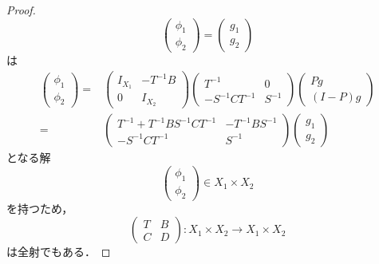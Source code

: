 \documentclass[11pt,a4paper,titlepage]{jsreport}
\theoremstyle{definition}
\begin{document}
\begin{proof}
\begin{equation*}
\begin{pmatrix}
      \phi_1 \\
      \phi_2
    \end{pmatrix}
    =
    \begin{pmatrix}
      g_1 \\
      g_2
    \end{pmatrix}
  \end{equation*}
  は
  \begin{equation*}
    \begin{split}
      \begin{pmatrix}
        \phi_1 \\
        \phi_2
      \end{pmatrix}
      =&
      \begin{pmatrix}
        I_{X_1} & -T^{-1}B \\
        0 & I_{X_2}
      \end{pmatrix}
      \begin{pmatrix}
        T^{-1} & 0 \\
        -S^{-1}CT^{-1} & S^{-1}
      \end{pmatrix}
      \begin{pmatrix}
        Pg \\
        (I-P)g
      \end{pmatrix}
      \\=&
      \begin{pmatrix}
        T^{-1}+T^{-1}BS^{-1}CT^{-1} & -T^{-1}BS^{-1} \\
        -S^{-1}CT^{-1} & S^{-1}
      \end{pmatrix}
      \begin{pmatrix}
        g_1 \\
        g_2
      \end{pmatrix}
    \end{split}
  \end{equation*}
  となる解
  \begin{equation*}
    \begin{pmatrix}
      \phi_1 \\
      \phi_2
    \end{pmatrix}
    \in X_1 \times X_2
  \end{equation*}
  を持つため，
  \begin{equation*}
    \begin{pmatrix}
      T & B \\
      C & D
    \end{pmatrix}
    : X_1 \times X_2 \rightarrow X_1 \times X_2
  \end{equation*}
  は全射でもある．


\end{proof}
\end{document}
